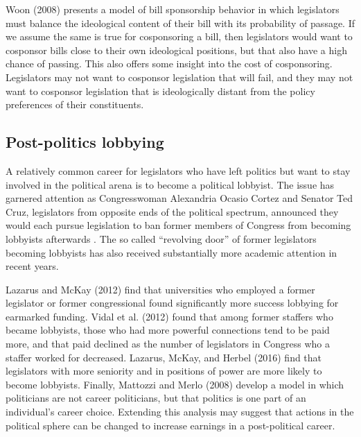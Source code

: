 \documentclass{article}
\begin{document}
Woon (2008) \cite{woon2008} presents a model of bill sponsorship behavior in which legislators must balance the ideological content of their bill with its probability of passage. If we assume the same is true for cosponsoring a bill, then legislators would want to cosponsor bills close to their own ideological positions, but that also have a high chance of passing. This also offers some insight into the cost of cosponsoring. Legislators may not want to cosponsor legislation that will fail, and they may not want to cosponsor legislation that is ideologically distant from the policy preferences of their constituents. 

\subsection{Post-politics lobbying}
A relatively common career for legislators who have left politics but want to stay involved in the political arena is to become a political lobbyist. The issue has garnered attention as Congresswoman Alexandria Ocasio Cortez and Senator Ted Cruz, legislators from opposite ends of the political spectrum, announced they would each pursue legislation to ban former members of Congress from becoming lobbyists afterwards \cite{vox_lobbying}. The so called ``revolving door'' of former legislators becoming lobbyists has also received substantially more academic attention in recent years.

Lazarus and McKay (2012) \cite{lazarus_mckay2012} find that universities who employed a former legislator or former congressional found significantly more success lobbying for earmarked funding. Vidal et al. (2012) \cite{vidal2012} found that among former staffers who became lobbyists, those who had more powerful connections tend to be paid more, and that paid declined as the number of legislators in Congress who a staffer worked for decreased. Lazarus, McKay, and Herbel (2016) \cite{lazarus_mckay_herbel2016} find that legislators with more seniority and in positions of power are more likely to become lobbyists. Finally, Mattozzi and Merlo (2008) \cite{mattozzi_merlo2008} develop a model in which politicians are not career politicians, but that politics is one part of an individual's career choice. Extending this analysis may suggest that actions in the political sphere can be changed to increase earnings in a post-political career.
\end{document}
